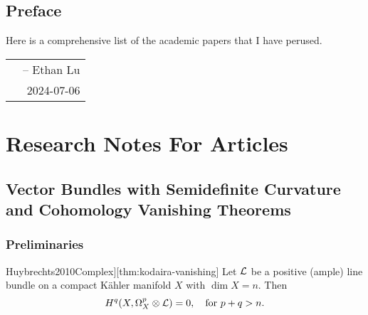 \documentclass[lang=en,12pt]{beautybook}
\begin{document}
\frontmatter
{}

{%
\thispagestyle{empty}
\chapter*{Preface}
Here is a comprehensive list of the academic papers that I have perused.


\hfill
\begin{tabular}{lr}
    &-- Ethan Lu\\ 
    &2024-07-06
\end{tabular}
\clearpage}

\thispagestyle{empty}
\tableofcontents\let\cleardoublepage\clearpage


\mainmatter
{}

\part{Research Notes For Articles}


\chapter{Vector Bundles with Semidefinite Curvature and Cohomology Vanishing Theorems}

\section{Preliminaries}

\begin{theorem}[][Kodaira vanishing theorem\cite[P196]{Huybrechts2010Complex}][thm:kodaira-vanishing]
	Let ${\mathcal L}$ be a positive (ample) line bundle on a compact K\"ahler manifold $X$ with $\dim X=n$. Then 
	\begin{equation}
		H^q (X,\Omega_X^p \otimes {\mathcal L})=0,\quad \text{for  }p+q>n.
	\end{equation}
\end{theorem}
\end{document}

